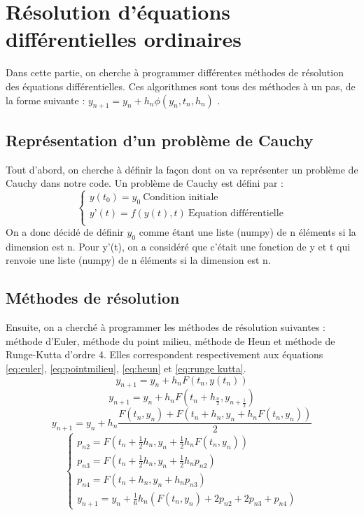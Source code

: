 \section{Résolution d'équations différentielles ordinaires}
Dans cette partie, on cherche à programmer différentes méthodes de résolution
des équations différentielles.
Ces algorithmes sont tous des méthodes à un pas, de la forme suivante :
	$y_{n+1}=y_n+h_n\phi (y_n,t_n,h_n)$ .

\subsection{Représentation d'un problème de Cauchy}
Tout d'abord, on cherche à définir la façon dont on va représenter
un problème de Cauchy dans notre code. Un problème de Cauchy est défini par :
\begin{equation}
    \begin{cases}
        y(t_0)=y_0 ~\text{Condition initiale}\\
        y’(t)=f(y(t),t)~\text{Equation différentielle} \\
    \end{cases}    
\end{equation}
On a donc décidé de définir $y_{0}$ comme étant une liste (numpy) de n éléments si la dimension est n. 
Pour y'(t), on a considéré que
c'était une fonction de y et t qui renvoie une liste (numpy) de n éléments si la dimension est n.
\subsection{Méthodes de résolution}
Ensuite, on a cherché à programmer les méthodes de résolution suivantes : méthode d’Euler, méthode du point milieu,
méthode de Heun et méthode de Runge-Kutta d’ordre 4. Elles correspondent respectivement aux équations
\ref{eq:euler}, \ref{eq:pointmilieu}, \ref{eq:heun} et \ref{eq:runge kutta}.
\begin{equation}
    y_{n+1} = y_n + h_n F (t_n, y(t_n))
    \label{eq:euler}
\end{equation}
\begin{equation}
    y_{n+1} = y_n + h_n  F(t_n + h_{\frac{n}{2}}, y_{n+ \frac{1}{2} })
    \label{eq:pointmilieu}
\end{equation}
\begin{equation}
        y_{n+1} = y_n + h_n \frac{F(t_n, y_n) + F(t_n+h_n, y_n + h_n F(t_n, y_n))}{2}
    \label{eq:heun}
\end{equation}
\begin{equation}
    \begin{cases}
        p_{n2} = F(t_n+\frac{1}{2}h_n,y_n+\frac{1}{2}h_n F(t_n, y_n))\\
        p_{n3} = F(t_n+\frac{1}{2}h_n,y_n+\frac{1}{2}h_n p_{n2})\\
        p_{n4} = F(t_n+h_n,y_n+h_n p_{n3})\\
        y_{n+1} = y_n + \frac{1}{6} h_n (F(t_n, y_n) + 2p_{n2} + 2p_{n3} + p_{n4})
    \end{cases}
    \label{eq:runge kutta}
\end{equation}

